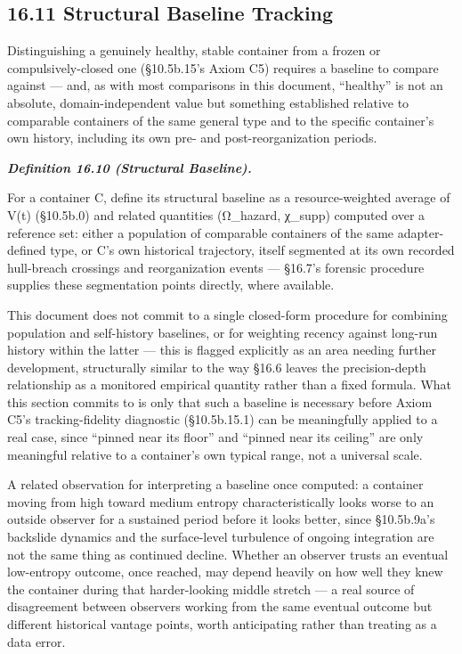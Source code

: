 \documentclass[
]{article}
\begin{document}
\hypertarget{structural-baseline-tracking}{%
\subsection{16.11 Structural Baseline
Tracking}\label{structural-baseline-tracking}}

Distinguishing a genuinely healthy, stable container from a frozen or
compulsively-closed one (§10.5b.15's Axiom C5) requires a baseline to
compare against --- and, as with most comparisons in this document,
``healthy'' is not an absolute, domain-independent value but something
established relative to comparable containers of the same general type
and to the specific container's own history, including its own pre- and
post-reorganization periods.

\emph{\textbf{Definition 16.10 (Structural Baseline).}}

For a container C, define its structural baseline as a resource-weighted
average of V(t) (§10.5b.0) and related quantities (Ω\_hazard, χ\_supp)
computed over a reference set: either a population of comparable
containers of the same adapter-defined type, or C's own historical
trajectory, itself segmented at its own recorded hull-breach crossings
and reorganization events --- §16.7's forensic procedure supplies these
segmentation points directly, where available.

This document does not commit to a single closed-form procedure for
combining population and self-history baselines, or for weighting
recency against long-run history within the latter --- this is flagged
explicitly as an area needing further development, structurally similar
to the way §16.6 leaves the precision-depth relationship as a monitored
empirical quantity rather than a fixed formula. What this section
commits to is only that such a baseline is necessary before Axiom C5's
tracking-fidelity diagnostic (§10.5b.15.1) can be meaningfully applied
to a real case, since ``pinned near its floor'' and ``pinned near its
ceiling'' are only meaningful relative to a container's own typical
range, not a universal scale.

A related observation for interpreting a baseline once computed: a
container moving from high toward medium entropy characteristically
looks worse to an outside observer for a sustained period before it
looks better, since §10.5b.9a's backslide dynamics and the surface-level
turbulence of ongoing integration are not the same thing as continued
decline. Whether an observer trusts an eventual low-entropy outcome,
once reached, may depend heavily on how well they knew the container
during that harder-looking middle stretch --- a real source of
disagreement between observers working from the same eventual outcome
but different historical vantage points, worth anticipating rather than
treating as a data error.
\end{document}
